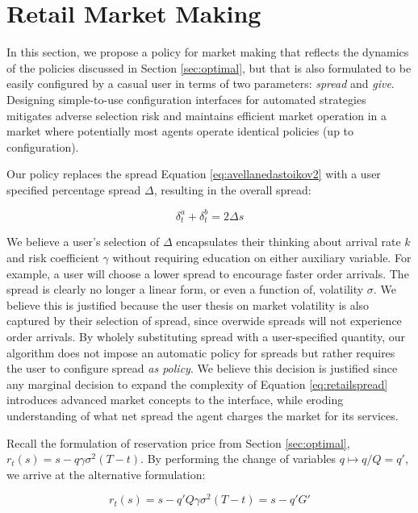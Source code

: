 \documentclass{article}
\begin{document}
\section{Retail Market Making}
\label{sec:retail}

In this section, we propose a policy for market making that reflects the dynamics of the policies discussed in Section \ref{sec:optimal}, but that is also formulated to be easily configured by a casual user in terms of two parameters: \emph{spread} and \emph{give}. Designing simple-to-use configuration interfaces for automated strategies mitigates adverse selection risk and maintains efficient market operation in a market where potentially most agents operate identical policies (up to configuration).

Our policy replaces the spread Equation \ref{eq:avellanedastoikov2} with a user specified percentage spread $\Delta$, resulting in the overall spread:

\begin{equation}
\label{eq:retailspread}
\delta^a_t + \delta^b_t = 2 \Delta s
\end{equation}

We believe a user's selection of $\Delta$ encapsulates their thinking about arrival rate $k$ and risk coefficient $\gamma$ without requiring education on either auxiliary variable. For example, a user will choose a lower spread to encourage faster order arrivals. The spread is clearly no longer a linear form, or even a function of, volatility $\sigma$. We believe this is justified because the user thesis on market volatility is also captured by their selection of spread, since overwide spreads will not experience order arrivals. By wholely substituting spread with a user-specified quantity, our algorithm does not impose an automatic policy for spreads but rather requires the user to configure spread \emph{as policy}. We believe this decision is justified since any marginal decision to expand the complexity of Equation \ref{eq:retailspread} introduces advanced market concepts to the interface, while eroding understanding of what net spread the agent charges the market for its services.

Recall the formulation of reservation price from Section \ref{sec:optimal}, $r_t(s) = s - q \gamma \sigma^2(T - t)$. By performing the change of variables $q \mapsto q/Q = q'$, we arrive at the alternative formulation:

\begin{equation}
\label{eq:retailprice}
r_t(s) = s - q' Q \gamma \sigma^2(T - t) = s - q' G'
\end{equation}
\end{document}
